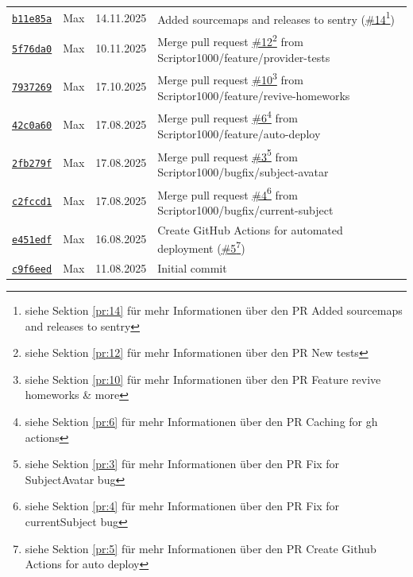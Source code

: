 \documentclass{article}%
\begin{document}
\begin{longtable}{l l l p{12cm}}
\href{https://github.com/scriptor1000/homeworks/commit/b11e85ad31eb624546acbc3c641df8f9823b263a}{\underline{\texttt{b11e85a}}}&Max&14.11.2025&Added sourcemaps and releases to sentry (\href{https://github.com/scriptor1000/homeworks/pull/14}{\underline{\#14}}\footnote{siehe Sektion \ref{pr:14} für mehr Informationen über den PR Added sourcemaps and releases to sentry})\\%
\href{https://github.com/scriptor1000/homeworks/commit/5f76da03acb089e896123bde03757a871e562306}{\underline{\texttt{5f76da0}}}&Max&10.11.2025&Merge pull request \href{https://github.com/scriptor1000/homeworks/pull/12}{\underline{\#12}}\footnote{siehe Sektion \ref{pr:12} für mehr Informationen über den PR New tests} from Scriptor1000/feature/provider{-}tests\\%
\href{https://github.com/scriptor1000/homeworks/commit/79372693a9896a287b95833c635d6336950c599f}{\underline{\texttt{7937269}}}&Max&17.10.2025&Merge pull request \href{https://github.com/scriptor1000/homeworks/pull/10}{\underline{\#10}}\footnote{siehe Sektion \ref{pr:10} für mehr Informationen über den PR Feature revive homeworks \& more} from Scriptor1000/feature/revive{-}homeworks\\%
\href{https://github.com/scriptor1000/homeworks/commit/42c0a604e103bbecf4ba6c5caea5f3d2393623f8}{\underline{\texttt{42c0a60}}}&Max&17.08.2025&Merge pull request \href{https://github.com/scriptor1000/homeworks/pull/6}{\underline{\#6}}\footnote{siehe Sektion \ref{pr:6} für mehr Informationen über den PR Caching for gh actions} from Scriptor1000/feature/auto{-}deploy\\%
\href{https://github.com/scriptor1000/homeworks/commit/2fb279fda9e7bd82a072d693d2632a5bf9a8d061}{\underline{\texttt{2fb279f}}}&Max&17.08.2025&Merge pull request \href{https://github.com/scriptor1000/homeworks/pull/3}{\underline{\#3}}\footnote{siehe Sektion \ref{pr:3} für mehr Informationen über den PR Fix for SubjectAvatar bug} from Scriptor1000/bugfix/subject{-}avatar\\%
\href{https://github.com/scriptor1000/homeworks/commit/c2fccd11ec2995b62c67bba2548e2eaa94730074}{\underline{\texttt{c2fccd1}}}&Max&17.08.2025&Merge pull request \href{https://github.com/scriptor1000/homeworks/pull/4}{\underline{\#4}}\footnote{siehe Sektion \ref{pr:4} für mehr Informationen über den PR Fix for currentSubject bug} from Scriptor1000/bugfix/current{-}subject\\%
\href{https://github.com/scriptor1000/homeworks/commit/e451edff7cce97b0aeea36db4ddee264f018e6a8}{\underline{\texttt{e451edf}}}&Max&16.08.2025&Create GitHub Actions for automated deployment (\href{https://github.com/scriptor1000/homeworks/pull/5}{\underline{\#5}}\footnote{siehe Sektion \ref{pr:5} für mehr Informationen über den PR Create Github Actions for auto deploy})\\%
\href{https://github.com/scriptor1000/homeworks/commit/c9f6eedeaed033611a0473788eff135e894c8128}{\underline{\texttt{c9f6eed}}}&Max&11.08.2025&Initial commit\\%
\end{longtable}
\end{document}
